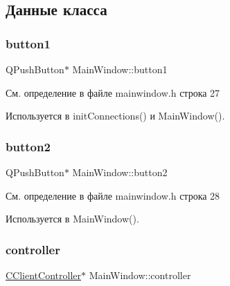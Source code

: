 \subsection{Данные класса}
\hypertarget{class_main_window_a96ee7d6a31dd131de9220930822f9da7}{}\label{class_main_window_a96ee7d6a31dd131de9220930822f9da7} 
\subsubsection{\texorpdfstring{button1}{button1}}
{\footnotesize\ttfamily Q\+Push\+Button$\ast$ Main\+Window\+::button1\hspace{0.3cm}{\ttfamily [private]}}



См. определение в файле mainwindow.\+h строка 27



Используется в init\+Connections() и Main\+Window().

\hypertarget{class_main_window_ad24e1c4eebdd74c9aadeea1f4c98414f}{}\label{class_main_window_ad24e1c4eebdd74c9aadeea1f4c98414f} 
\subsubsection{\texorpdfstring{button2}{button2}}
{\footnotesize\ttfamily Q\+Push\+Button$\ast$ Main\+Window\+::button2\hspace{0.3cm}{\ttfamily [private]}}



См. определение в файле mainwindow.\+h строка 28



Используется в Main\+Window().

\hypertarget{class_main_window_af1f864005894311612c0b9174f82db8a}{}\label{class_main_window_af1f864005894311612c0b9174f82db8a} 
\subsubsection{\texorpdfstring{controller}{controller}}
{\footnotesize\ttfamily \hyperlink{class_c_client_controller}{C\+Client\+Controller}$\ast$ Main\+Window\+::controller\hspace{0.3cm}{\ttfamily [private]}}



